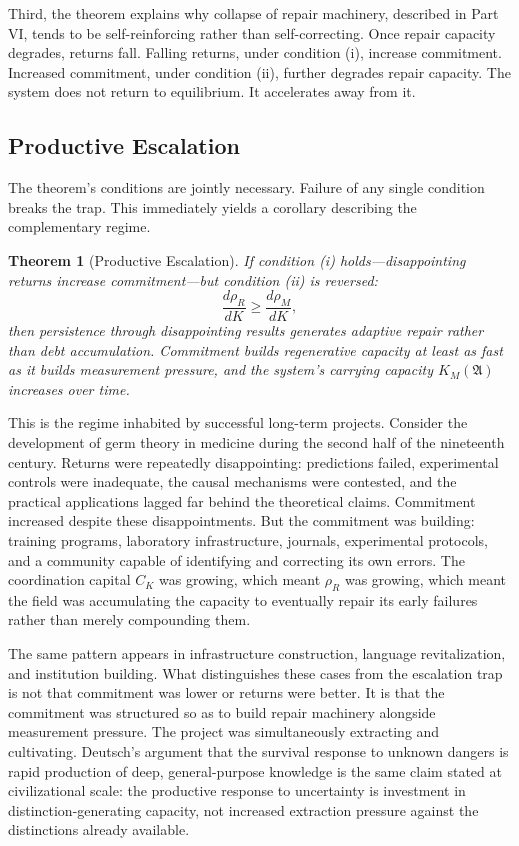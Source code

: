 \documentclass[12pt, a4paper]{article}
\theoremstyle{flyxion}
\newtheorem{theorem}{Theorem}
\newcommand{\fA}{\mathfrak{A}}
\newcommand{\rhoM}{\rho_{M}}
\newcommand{\rhoR}{\rho_{R}}
\newcommand{\KM}{K_{M}}
\begin{document}
Third, the theorem explains why collapse of repair machinery, described in Part VI, tends to be self-reinforcing rather than self-correcting. Once repair capacity degrades, returns fall. Falling returns, under condition (i), increase commitment. Increased commitment, under condition (ii), further degrades repair capacity. The system does not return to equilibrium. It accelerates away from it.

\subsection*{Productive Escalation}

The theorem's conditions are jointly necessary. Failure of any single condition breaks the trap. This immediately yields a corollary describing the complementary regime.

\begin{theorem}[Productive Escalation]
If condition (i) holds---disappointing returns increase commitment---but condition (ii) is reversed:
\[
  \frac{d\rhoR}{dK} \geq \frac{d\rhoM}{dK},
\]
then persistence through disappointing results generates adaptive repair rather than debt accumulation. Commitment builds regenerative capacity at least as fast as it builds measurement pressure, and the system's carrying capacity $\KM(\fA)$ increases over time.
\end{theorem}

This is the regime inhabited by successful long-term projects. Consider the development of germ theory in medicine during the second half of the nineteenth century. Returns were repeatedly disappointing: predictions failed, experimental controls were inadequate, the causal mechanisms were contested, and the practical applications lagged far behind the theoretical claims. Commitment increased despite these disappointments. But the commitment was building: training programs, laboratory infrastructure, journals, experimental protocols, and a community capable of identifying and correcting its own errors. The coordination capital $C_K$ was growing, which meant $\rhoR$ was growing, which meant the field was accumulating the capacity to eventually repair its early failures rather than merely compounding them.

The same pattern appears in infrastructure construction, language revitalization, and institution building. What distinguishes these cases from the escalation trap is not that commitment was lower or returns were better. It is that the commitment was structured so as to build repair machinery alongside measurement pressure. The project was simultaneously extracting and cultivating. Deutsch's argument that the survival response to unknown dangers is rapid production of deep, general-purpose knowledge \cite{deutsch2011} is the same claim stated at civilizational scale: the productive response to uncertainty is investment in distinction-generating capacity, not increased extraction pressure against the distinctions already available.
\end{document}
